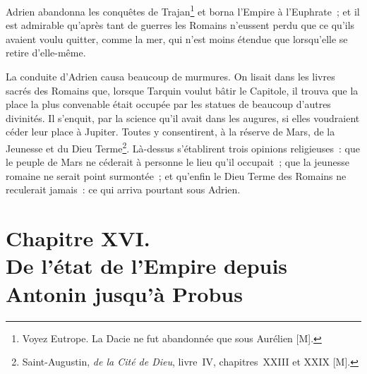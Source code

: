 \documentclass[french,twoside]{book} %
\newcommand\chapteropen{} %
\newcommand\chapterclose{} %
\begin{document}
Adrien abandonna les conquêtes de Trajan\footnote{Voyez Eutrope. La Dacie ne fut abandonnée que sous Aurélien [M].} et borna l’Empire à l’Euphrate ; et il est admirable qu’après tant de guerres les Romains n’eussent perdu que ce qu’ils avaient voulu quitter, comme la mer, qui n’est moins étendue que lorsqu’elle se retire d’elle-même.\par
La conduite d’Adrien causa beaucoup de murmures. On lisait dans les livres sacrés des Romains que, lorsque Tarquin voulut bâtir le Capitole, il trouva que la place la plus convenable était occupée par les statues de beaucoup d’autres divinités. Il s’enquit, par la science qu’il avait dans les augures, si elles voudraient céder leur place à Jupiter. Toutes y consentirent, à la réserve de Mars, de la Jeunesse et du Dieu Terme\footnote{Saint-Augustin, {\itshape de la Cité de Dieu}, livre IV, chapitres XXIII et XXIX [M].}. Là-dessus s’établirent trois opinions religieuses : que le peuple de Mars ne céderait à personne le lieu qu’il occupait ; que la jeunesse romaine ne serait point surmontée ; et qu’enfin le Dieu Terme des Romains ne reculerait jamais : ce qui arriva pourtant sous Adrien.
\chapterclose


\chapteropen
\chapter[{Chapitre XVI. De l’état de l’Empire depuis Antonin jusqu’à Probus}]{Chapitre XVI. \\
De l’état de l’Empire depuis Antonin jusqu’à Probus}
\label{considérations\_Romains\_chap\_16}\renewcommand{\leftmark}{Chapitre XVI. \\
De l’état de l’Empire depuis Antonin jusqu’à Probus}
\end{document}
